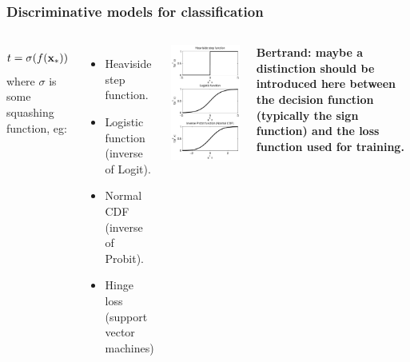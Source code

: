 \begin{frame}
\frametitle{Discriminative models for classification}
\begin{columns}[c]
\begin{align*}
t = \sigma(f({\bf x}_*)) 
\end{align*}
where $\sigma$ is some squashing function, eg:
\begin{itemize}
\item Heaviside step function.
\item Logistic function (inverse of Logit).
\item Normal CDF (inverse of Probit).
\item Hinge loss (support vector machines)
\end{itemize}
\includegraphics[width=.75\textwidth]{squashing}

\textbf{Bertrand: maybe a distinction should be introduced here between the decision function (typically the sign function) and the loss function used for training.}

\end{columns}
\end{frame}

